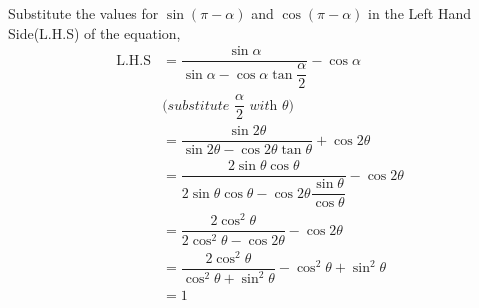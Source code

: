 \begin{solution}
  Substitute the values for $\sin(\pi - \alpha)$ and $\cos(\pi - \alpha)$ 
  in the Left Hand Side(L.H.S) of the equation,
  \begin{align}
    \text{L.H.S} &= \dfrac{\sin\alpha}{\sin\alpha -
    				  \cos\alpha\tan\dfrac{\alpha}{2}}
					  - \cos\alpha \\
    &\textit{(substitute $\dfrac{\alpha}{2}$ with $\theta$)} \nonumber \\
				 &= \dfrac{\sin 2\theta}{\sin 2\theta - 
				 	  \cos 2\theta\tan\theta} + \cos 2\theta \\	
				 &= \dfrac{2\sin\theta\cos\theta}{2\sin\theta\cos\theta - 
				 	  \cos 2\theta\dfrac{\sin\theta}{\cos\theta}} 
				 	  - \cos 2\theta \\ 				
				 &= \dfrac{2\cos ^2\theta}{2\cos^2\theta - 
				 	  \cos 2\theta} - \cos 2\theta \\
				 &= \dfrac{2\cos^2\theta}{\cos^2\theta + \sin^2\theta} -
				 	  \cos^2\theta + \sin^2\theta \\
				 &= 1	  				
  \end{align}
\end{solution}